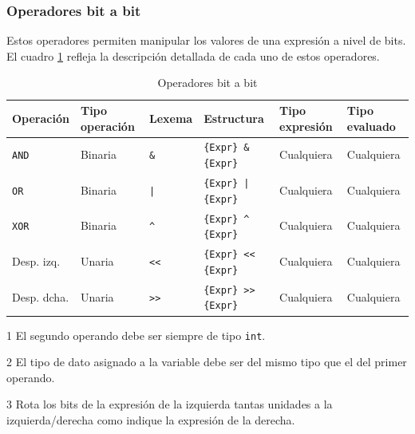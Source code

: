 \documentclass[11pt, english]{article}
\begin{document}
	\subsubsection{Operadores bit a bit}\label{bitwise-operators}
	Estos operadores permiten manipular los valores de una expresión a nivel de bits. El cuadro \ref{tab:bitwise} refleja la descripción detallada de cada uno de estos operadores.
	
	\begin{table}[H]
		\begin{center}
			\caption{Operadores bit a bit}\label{tab:bitwise}
			\begin{threeparttable}
				\begin{tabular}{l|l|l|l|l|l}
					\toprule
					\textbf{Operación} & \textbf{Tipo operación} & \textbf{Lexema} & \textbf{Estructura} & \textbf{Tipo expresión}\tnote{1} & \textbf{Tipo evaluado}\tnote{2}\\
					\midrule
					\texttt{AND} & Binaria & \texttt{\&} &  \texttt{\{Expr\} \& \{Expr\}} & Cualquiera & Cualquiera\\
					\texttt{OR} & Binaria & \texttt{|} &  \texttt{\{Expr\} | \{Expr\}} & Cualquiera & Cualquiera\\
					\texttt{XOR} & Binaria & \texttt{\textasciicircum} &  \texttt{\{Expr\} \textasciicircum \, \{Expr\}} & Cualquiera & Cualquiera\\
					Desp. izq. & Unaria & \texttt{\textless\textless} &  \texttt{\{Expr\} \textless\textless\, \{Expr\}}\tnote{3}\,& Cualquiera & Cualquiera\\
					Desp. dcha. & Unaria & \texttt{\textgreater\textgreater} & \texttt{\{Expr\} \textgreater\textgreater\, \{Expr\}}\tnote{3}\, & Cualquiera & Cualquiera\\
					\bottomrule
				\end{tabular}
				\begin{tablenotes}
					\small
					\item[1] El segundo operando debe ser siempre de tipo \texttt{int}.
					\item[2] El tipo de dato asignado a la variable debe ser del mismo tipo que el del primer operando.
					\item[3] Rota los bits de la expresión de la izquierda tantas unidades a la izquierda/derecha como indique la expresión de la derecha.
				\end{tablenotes}
			\end{threeparttable}
		\end{center}
	\end{table}
	
\end{document}
